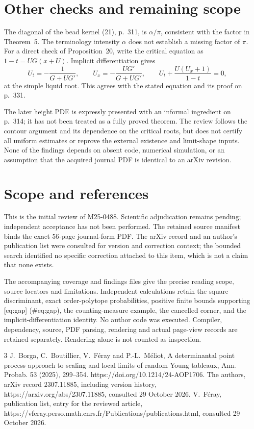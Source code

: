 \documentclass[10pt]{article}
\begin{document}
\section*{Other checks and remaining scope}
The diagonal of the bead kernel (21), p. 311, is \(\alpha/\pi\), consistent with the factor in Theorem 5. The terminology intensity \(\alpha\) does not establish a missing factor of \(\pi\). For a direct check of Proposition 20, write the critical equation as \(1-t=U G(x+U)\). Implicit differentiation gives \[U_t=-\frac1{G+UG'},\qquad U_x=-\frac{UG'}{G+UG'},
 \qquad U_t+\frac{U(U_x+1)}{1-t}=0,\] at the simple liquid root. This agrees with the stated equation and its proof on p. 331.\par
The later height PDE is expressly presented with an informal ingredient on p. 314; it has not been treated as a fully proved theorem. The review follows the contour argument and its dependence on the critical roots, but does not certify all uniform estimates or reprove the external existence and limit-shape inputs. None of the findings depends on absent code, numerical simulation, or an assumption that the acquired journal PDF is identical to an arXiv revision.\par
\section*{Scope and references}
This is the initial review of M25-0488. Scientific adjudication remains pending; independent acceptance has not been performed. The retained source manifest binds the exact 56-page journal-form PDF. The arXiv record and an author’s publication list were consulted for version and correction context; the bounded search identified no specific correction attached to this item, which is not a claim that none exists.\par
The accompanying coverage and findings files give the precise reading scope, source locators and limitations. Independent calculations retain the square discriminant, exact order-polytope probabilities, positive finite bounds supporting [eq:gap] (\#eq:gap), the counting-measure example, the cancelled corner, and the implicit-differentiation identity. No author code was executed. Compiler, dependency, source, PDF parsing, rendering and actual page-view records are retained separately. Rendering alone is not counted as inspection.\par
3 J. Borga, C. Boutillier, V. Féray and P.-L. Méliot, A determinantal point process approach to scaling and local limits of random Young tableaux, Ann. Probab. 53 (2025), 299–354. https://doi.org/10.1214/24-AOP1706. The authors, arXiv record 2307.11885, including version history, https://arxiv.org/abs/2307.11885, consulted 29 October 2026. V. Féray, publication list, entry for the reviewed article, https://vferay.perso.math.cnrs.fr/Publications/publications.html, consulted 29 October 2026.\par
\end{document}

